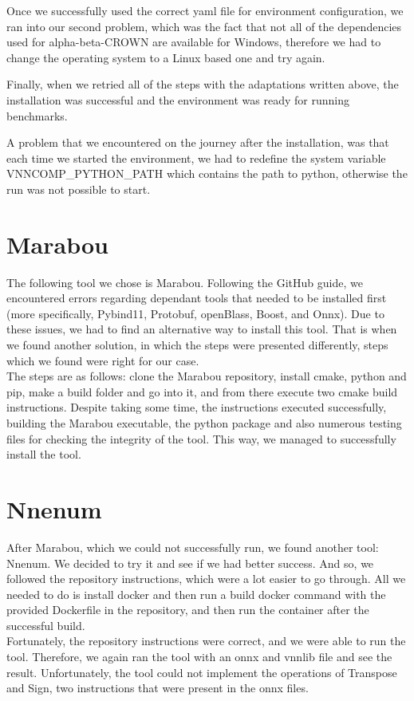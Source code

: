 \documentclass[12pt,a4paper]{report}
\newcommand\tab[1][5mm]{\hspace*{#1}}
\begin{document}
Once we successfully used the correct yaml file for environment configuration, we ran into our second problem, which was the fact that not all of the dependencies used for alpha-beta-CROWN are available for Windows, therefore we had to change the operating system to a Linux based one and try again.

Finally, when we retried all of the steps with the adaptations written above, the installation was successful and the environment was ready for running benchmarks.

A problem that we encountered on the journey after the installation, was that each time we started the environment, we had to redefine the system variable VNNCOMP\_PYTHON\_PATH which contains the path to python, otherwise the run was not possible to start.

\newpage
\section{Marabou}
\tab The following tool we chose is Marabou. Following the GitHub guide, we encountered errors regarding dependant tools that needed to be installed first (more specifically, Pybind11, Protobuf, openBlass, Boost, and Onnx). Due to these issues, we had to find an alternative way to install this tool. That is when we found another solution, in which the steps were presented differently, steps which we found were right for our case.\\
\tab The steps are as follows: clone the Marabou repository, install cmake, python and pip, make a build folder and go into it, and from there execute two cmake build instructions. Despite taking some time, the instructions executed successfully, building the Marabou executable, the python package and also numerous testing files for checking the integrity of the tool. This way, we managed to successfully install the tool.\\

\section{Nnenum}
\tab After Marabou, which we could not successfully run, we found another tool: Nnenum. We decided to try it and see if we had better success. And so, we followed the repository instructions, which were a lot easier to go through. All we needed to do is install docker and then run a build docker command with the provided Dockerfile in the repository, and then run the container after the successful build.\\
\tab Fortunately, the repository instructions were correct, and we were able to run the tool. Therefore, we again ran the tool with an onnx and vnnlib file and see the result. Unfortunately, the tool could not implement the operations of Transpose and Sign, two instructions that were present in the onnx files.
\end{document}
